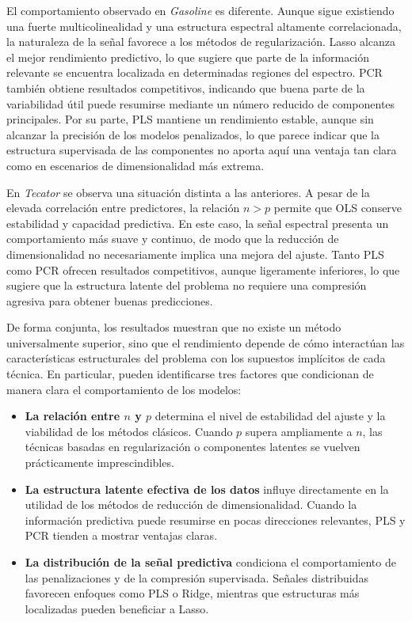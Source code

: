 \documentclass[12pt,a4paper]{report}
\begin{document}
El comportamiento observado en \textit{Gasoline} es diferente. Aunque sigue existiendo una fuerte multicolinealidad y una estructura espectral altamente correlacionada, la naturaleza de la señal favorece a los métodos de regularización. Lasso alcanza el mejor rendimiento predictivo, lo que sugiere que parte de la información relevante se encuentra localizada en determinadas regiones del espectro. PCR también obtiene resultados competitivos, indicando que buena parte de la variabilidad útil puede resumirse mediante un número reducido de componentes principales. Por su parte, PLS mantiene un rendimiento estable, aunque sin alcanzar la precisión de los modelos penalizados, lo que parece indicar que la estructura supervisada de las componentes no aporta aquí una ventaja tan clara como en escenarios de dimensionalidad más extrema.

En \textit{Tecator} se observa una situación distinta a las anteriores. A pesar de la elevada correlación entre predictores, la relación \(n > p\) permite que OLS conserve estabilidad y capacidad predictiva. En este caso, la señal espectral presenta un comportamiento más suave y continuo, de modo que la reducción de dimensionalidad no necesariamente implica una mejora del ajuste. Tanto PLS como PCR ofrecen resultados competitivos, aunque ligeramente inferiores, lo que sugiere que la estructura latente del problema no requiere una compresión agresiva para obtener buenas predicciones.

De forma conjunta, los resultados muestran que no existe un método universalmente superior, sino que el rendimiento depende de cómo interactúan las características estructurales del problema con los supuestos implícitos de cada técnica. En particular, pueden identificarse tres factores que condicionan de manera clara el comportamiento de los modelos:

\begin{itemize}
    \item \textbf{La relación entre \(n\) y \(p\)} determina el nivel de estabilidad del ajuste y la viabilidad de los métodos clásicos. Cuando \(p\) supera ampliamente a \(n\), las técnicas basadas en regularización o componentes latentes se vuelven prácticamente imprescindibles.

    \item \textbf{La estructura latente efectiva de los datos} influye directamente en la utilidad de los métodos de reducción de dimensionalidad. Cuando la información predictiva puede resumirse en pocas direcciones relevantes, PLS y PCR tienden a mostrar ventajas claras.

    \item \textbf{La distribución de la señal predictiva} condiciona el comportamiento de las penalizaciones y de la compresión supervisada. Señales distribuidas favorecen enfoques como PLS o Ridge, mientras que estructuras más localizadas pueden beneficiar a Lasso.
\end{itemize}
\end{document}
